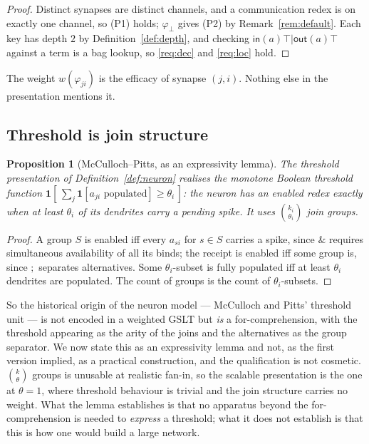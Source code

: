 \documentclass[11pt,a4paper]{article}
\theoremstyle{plain}
\newtheorem{proposition}[theorem]{Proposition}
\theoremstyle{definition}
\theoremstyle{remark}
\newcommand{\sepc}{\mathbin{\big|}}
\newcommand{\out}{\mathsf{out}}
\newcommand{\inn}{\mathsf{in}}
\newcommand{\wmap}{w}
\begin{document}
\begin{proof}
Distinct synapses are distinct channels, and a communication redex is on exactly one channel, so
(P1) holds; $\varphi_\bot$ gives (P2) by Remark~\ref{rem:default}. Each key has depth $2$ by
Definition~\ref{def:depth}, and checking $\inn(a)\top \sepc \out(a)\top$ against a term is a bag
lookup, so \ref{req:dec} and \ref{req:loc} hold.
\end{proof}

The weight $\wmap(\varphi_{ji})$ is the efficacy of synapse $(j,i)$. Nothing else in the presentation
mentions it.

\subsection{Threshold is join structure}

\begin{proposition}[McCulloch--Pitts, as an expressivity lemma]
\label{prop:mcp}
The threshold presentation of Definition~\ref{def:neuron} realises the monotone Boolean threshold
function $\mathbf{1}[\,\sum_{j} \mathbf{1}[a_{ji}\text{ populated}] \geq \theta_i\,]$: the neuron has
an enabled redex exactly when at least $\theta_i$ of its dendrites carry a pending spike. It uses
$\binom{k_i}{\theta_i}$ join groups.
\end{proposition}

\begin{proof}
A group $S$ is enabled iff every $a_{si}$ for $s \in S$ carries a spike, since $\&$ requires
simultaneous availability of all its binds; the receipt is enabled iff some group is, since $;$
separates alternatives. Some $\theta_i$-subset is fully populated iff at least $\theta_i$ dendrites
are populated. The count of groups is the count of $\theta_i$-subsets.
\end{proof}

So the historical origin of the neuron model --- McCulloch and Pitts' threshold unit \cite{mcp} ---
is not encoded in a weighted GSLT but \emph{is} a for-comprehension, with the threshold appearing as
the arity of the joins and the alternatives as the group separator. We now state this as an
expressivity lemma and not, as the first version implied, as a practical construction, and the
qualification is not cosmetic. $\binom{k}{\theta}$ groups is unusable at realistic fan-in, so the
scalable presentation is the one at $\theta = 1$, where threshold behaviour is trivial and the join
structure carries no weight. What the lemma establishes is that no apparatus beyond the
for-comprehension is needed to \emph{express} a threshold; what it does not establish is that this is
how one would build a large network.
\end{document}
